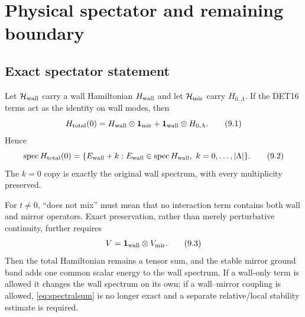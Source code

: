 \section{Physical spectator and remaining boundary}
\label{sec:boundary}

\subsection{Exact spectator statement}

Let $\mathcal H_{\rm wall}$ carry a wall Hamiltonian $H_{\rm wall}$ and let
$\mathcal H_{\rm mir}$ carry $H_{0,\Lambda}$.  If the DET16 terms act as the
identity on wall modes, then
\[
 H_{\rm total}(0)
 =H_{\rm wall}\otimes\mathbf 1_{\rm mir}
 +\mathbf 1_{\rm wall}\otimes H_{0,\Lambda}.
\tag{9.1}\label{eq:spectator}
\]
Hence
\[
 \operatorname{spec}H_{\rm total}(0)
 =\{E_{\rm wall}+k:
 E_{\rm wall}\in\operatorname{spec}H_{\rm wall},\
 k=0,\ldots,|\Lambda|\}.
\tag{9.2}\label{eq:spectralsum}
\]
The $k=0$ copy is exactly the original wall spectrum, with every
multiplicity preserved.

For $t\ne0$, ``does not mix'' must mean that no interaction term
contains both wall and mirror operators.  Exact preservation, rather
than merely perturbative continuity, further requires
\[
 V=\mathbf 1_{\rm wall}\otimes V_{\rm mir}.
\tag{9.3}\label{eq:nomix}
\]
Then the total Hamiltonian remains a tensor sum, and the stable mirror
ground band adds one common scalar energy to the wall spectrum.  If a
wall-only term is allowed it changes the wall spectrum on its own; if a
wall--mirror coupling is allowed, \eqref{eq:spectralsum} is no longer
exact and a separate relative/local stability estimate is required.

